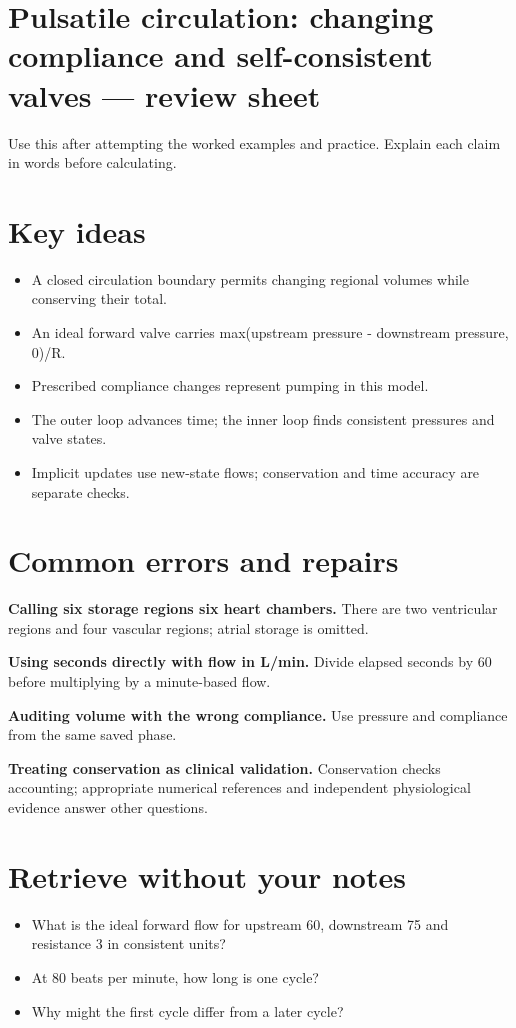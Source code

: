 \documentclass[11pt,letterpaper]{article}
\theoremstyle{definition}\newtheorem{definition}{Definition}\newtheorem{example}{Example}
\numberwithin{equation}{section}
\begin{document}
\section*{Pulsatile circulation: changing compliance and self-consistent valves --- review sheet}
Use this after attempting the worked examples and practice. Explain each claim in words before calculating.

\section*{Key ideas}
\begin{itemize}
\item A closed circulation boundary permits changing regional volumes while conserving their total.
\item An ideal forward valve carries max(upstream pressure - downstream pressure, 0)/R.
\item Prescribed compliance changes represent pumping in this model.
\item The outer loop advances time; the inner loop finds consistent pressures and valve states.
\item Implicit updates use new-state flows; conservation and time accuracy are separate checks.
\end{itemize}
\section*{Common errors and repairs}
\textbf{Calling six storage regions six heart chambers.} There are two ventricular regions and four vascular regions; atrial storage is omitted.

\textbf{Using seconds directly with flow in L/min.} Divide elapsed seconds by 60 before multiplying by a minute-based flow.

\textbf{Auditing volume with the wrong compliance.} Use pressure and compliance from the same saved phase.

\textbf{Treating conservation as clinical validation.} Conservation checks accounting; appropriate numerical references and independent physiological evidence answer other questions.

\section*{Retrieve without your notes}
\begin{itemize}
\item What is the ideal forward flow for upstream 60, downstream 75 and resistance 3 in consistent units?
\item At 80 beats per minute, how long is one cycle?
\item Why might the first cycle differ from a later cycle?
\end{itemize}
\end{document}
